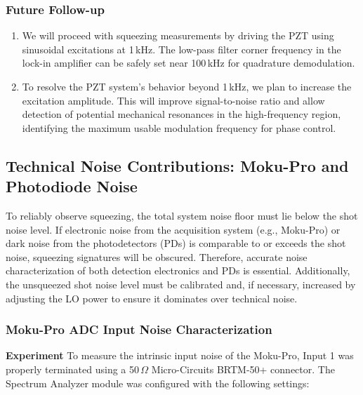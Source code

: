 \documentclass[colorlinks=true,pdfstartview=FitV,linkcolor=blue,
citecolor=red,urlcolor=magenta]{ligodoc}
\begin{document}
\subsubsection*{Future Follow-up}

\begin{enumerate}
    \item We will proceed with squeezing measurements by driving the PZT using sinusoidal excitations at 1\,kHz. The low-pass filter corner frequency in the lock-in amplifier can be safely set near 100\,kHz for quadrature demodulation.
    
    \item To resolve the PZT system’s behavior beyond 1\,kHz, we plan to increase the excitation amplitude. This will improve signal-to-noise ratio and allow detection of potential mechanical resonances in the high-frequency region, identifying the maximum usable modulation frequency for phase control.

\end{enumerate}






\subsection{Technical Noise Contributions: Moku-Pro and Photodiode Noise}

To reliably observe squeezing, the total system noise floor must lie below the shot noise level. If electronic noise from the acquisition system (e.g., Moku-Pro) or dark noise from the photodetectors (PDs) is comparable to or exceeds the shot noise, squeezing signatures will be obscured. Therefore, accurate noise characterization of both detection electronics and PDs is essential. Additionally, the unsqueezed shot noise level must be calibrated and, if necessary, increased by adjusting the LO power to ensure it dominates over technical noise.



\subsubsection{ Moku-Pro ADC Input Noise Characterization}

\textbf{Experiment}
To measure the intrinsic input noise of the Moku-Pro, Input 1 was properly terminated using a 50\,$\Omega$ Micro-Circuits BRTM-50+ connector. The Spectrum Analyzer module was configured with the following settings:
\end{document}
